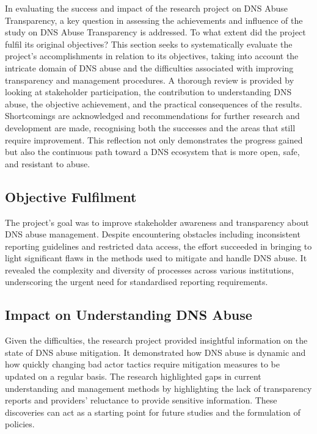 In evaluating the success and impact of the research project on DNS Abuse Transparency, a key question in assessing the achievements and influence of the study on DNS Abuse Transparency is addressed. To what extent did the project fulfil its original objectives? This section seeks to systematically evaluate the project's accomplishments in relation to its objectives, taking into account the intricate domain of DNS abuse and the difficulties associated with improving transparency and management procedures. A thorough review is provided by looking at stakeholder participation, the contribution to understanding DNS abuse, the objective achievement, and the practical consequences of the results. Shortcomings are acknowledged and recommendations for further research and development are made, recognising both the successes and the areas that still require improvement. This reflection not only demonstrates the progress gained but also the continuous path toward a DNS ecosystem that is more open, safe, and resistant to abuse.


\subsection{Objective Fulfilment}

The project's goal was to improve stakeholder awareness and transparency about DNS abuse management. Despite encountering obstacles including inconsistent reporting guidelines and restricted data access, the effort succeeded in bringing to light significant flaws in the methods used to mitigate and handle DNS abuse. It revealed the complexity and diversity of processes across various institutions, underscoring the urgent need for standardised reporting requirements.

\subsection{Impact on Understanding DNS Abuse}

Given the difficulties, the research project provided insightful information on the state of DNS abuse mitigation. It demonstrated how DNS abuse is dynamic and how quickly changing bad actor tactics require mitigation measures to be updated on a regular basis. The research highlighted gaps in current understanding and management methods by highlighting the lack of transparency reports and providers' reluctance to provide sensitive information. These discoveries can act as a starting point for future studies and the formulation of policies.

